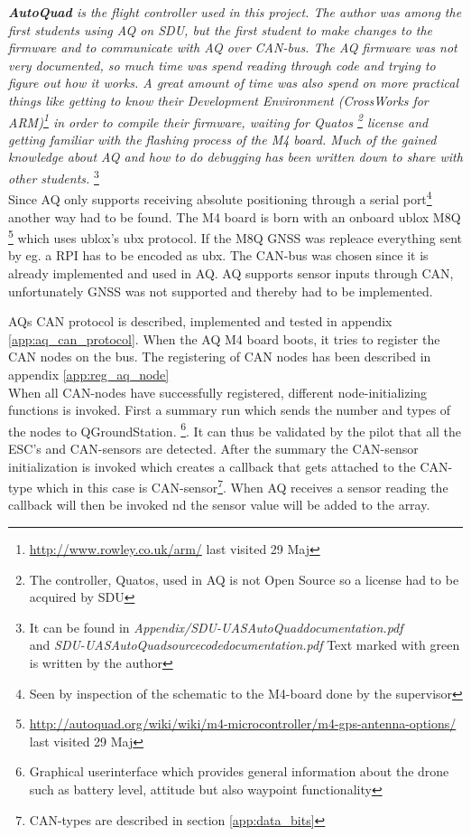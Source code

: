 \textit{\textbf{AutoQuad} is the flight controller used in this project.
The author was among the first students using \ac{AQ} on \ac{SDU}, but the first student to make changes to the firmware and to communicate with \ac{AQ} over \ac{CAN}-bus.
The \ac{AQ} firmware was not very documented, so much time was spend reading through code and trying to figure out how it works.
A great amount of time was also spend on more practical things like getting to know their Development Environment (CrossWorks for ARM)\footnote{\url{http://www.rowley.co.uk/arm/} last visited 29 Maj} in order to compile their firmware, waiting for Quatos \footnote{The controller, Quatos, used in AQ is not Open Source so a license had to be acquired by SDU} license and getting familiar with the flashing process of the M4 board.
Much of the gained knowledge about \ac{AQ} and how to do debugging has been written down to share with other students.}
\footnote{It can be found in \textit{Appendix/SDU-UASAutoQuaddocumentation.pdf} \\ and \textit{SDU-UASAutoQuadsourcecodedocumentation.pdf} Text marked with green is written by the author} \\


Since \ac{AQ} only supports receiving absolute positioning through a serial port\footnote{Seen by inspection of the schematic to the M4-board done by the supervisor} another way had to be found.
The M4 board is born with an onboard ublox M8Q \footnote{\url{http://autoquad.org/wiki/wiki/m4-microcontroller/m4-gps-antenna-options/} last visited 29 Maj} which uses ublox's ubx protocol. If the M8Q GNSS was repleace everything sent by eg. a RPI has to be encoded as ubx.
The CAN-bus was chosen since it is already implemented and used in \ac{AQ}. \ac{AQ} supports sensor inputs through CAN, unfortunately GNSS was not supported and thereby had to be implemented.

\ac{AQ}s CAN protocol is described, implemented and tested in appendix \ref{app:aq_can_protocol}.
When the AQ M4 board boots, it tries to register the CAN nodes on the bus. The registering of CAN nodes has been described in appendix \ref{app:reg_aq_node}\\

When all CAN-nodes have successfully registered, different node-initializing functions is invoked.
First a summary run which sends the number and types of the nodes to QGroundStation. \footnote{Graphical userinterface which provides general information about the drone such as battery level, attitude but also waypoint functionality}.
It can thus be validated by the pilot that all the ESC's and CAN-sensors are detected.
After the summary the CAN-sensor initialization is invoked which creates a callback that gets attached to the CAN-type which in this case is CAN-sensor\footnote{CAN-types are described in section \ref{app:data_bits}}. When \ac{AQ} receives a sensor reading the callback will then be invoked nd the sensor value will be added to the array.\\

